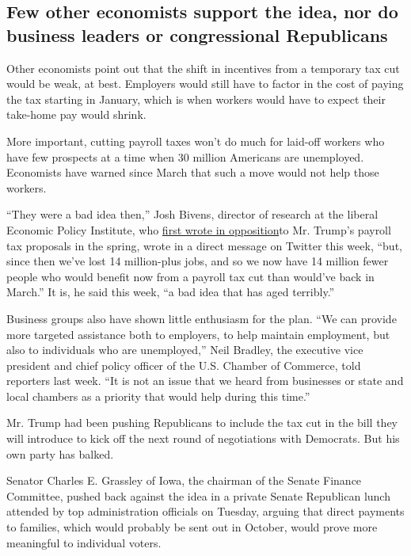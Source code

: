 \hypertarget{few-other-economists-support-the-idea-nor-do-business-leaders-or-congressional-republicans}{%
\subsection{Few other economists support the idea, nor do business
leaders or congressional
Republicans}\label{few-other-economists-support-the-idea-nor-do-business-leaders-or-congressional-republicans}}

Other economists point out that the shift in incentives from a temporary
tax cut would be weak, at best. Employers would still have to factor in
the cost of paying the tax starting in January, which is when workers
would have to expect their take-home pay would shrink.

More important, cutting payroll taxes won't do much for laid-off workers
who have few prospects at a time when 30 million Americans are
unemployed. Economists have warned since March that such a move would
not help those workers.

``They were a bad idea then,'' Josh Bivens, director of research at the
liberal Economic Policy Institute, who
\href{https://www.epi.org/blog/employer-tax-credits-can-be-part-of-the-economic-response-to-covid-19-if-they-finance-direct-benefits-for-workers/}{first
wrote in opposition}to Mr. Trump's payroll tax proposals in the spring,
wrote in a direct message on Twitter this week, ``but, since then we've
lost 14 million-plus jobs, and so we now have 14 million fewer people
who would benefit now from a payroll tax cut than would've back in
March.'' It is, he said this week, ``a bad idea that has aged
terribly.''

Business groups also have shown little enthusiasm for the plan. ``We can
provide more targeted assistance both to employers, to help maintain
employment, but also to individuals who are unemployed,'' Neil Bradley,
the executive vice president and chief policy officer of the U.S.
Chamber of Commerce, told reporters last week. ``It is not an issue that
we heard from businesses or state and local chambers as a priority that
would help during this time.''

Mr. Trump had been pushing Republicans to include the tax cut in the
bill they will introduce to kick off the next round of negotiations with
Democrats. But his own party has balked.

Senator Charles E. Grassley of Iowa, the chairman of the Senate Finance
Committee, pushed back against the idea in a private Senate Republican
lunch attended by top administration officials on Tuesday, arguing that
direct payments to families, which would probably be sent out in
October, would prove more meaningful to individual voters.

